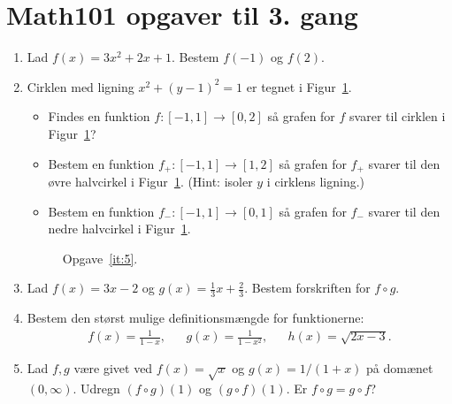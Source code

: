 \newpage
\section{Math101 opgaver til 3. gang}
\begin{enumerate}
	
	\item Lad $f(x)=3x^2+2x+1$. Bestem $f(-1)$ og $f(2)$.
	
	\item \label{it:5} Cirklen med ligning $x^{2} +(y-1)^{2}=1$ er tegnet i Figur~\ref{fig:5}.
	\begin{itemize}
		\item Findes en funktion $f\colon [-1,1]\to [0,2]$ så grafen for $f$ svarer til cirklen i Figur~\ref{fig:5}?
		\item Bestem en funktion $f_+\colon [-1,1]\to [1,2]$ så grafen for $f_+$ svarer til den øvre halvcirkel i Figur~\ref{fig:5}. (Hint: isoler $y$ i cirklens ligning.)
		\item Bestem en funktion $f_-\colon [-1,1]\to [0,1]$ så grafen for $f_-$ svarer til den nedre halvcirkel i Figur~\ref{fig:5}.
	\end{itemize}	
	\begin{figure}
		\centering
		\caption{Opgave~\ref{it:5}.}
		\label{fig:5}
	\end{figure}

	
	\item Lad $f(x)=3x-2$ og $g(x)=\frac{1}{3}x+\frac{2}{3}$. Bestem forskriften for $f\circ g$.

	\item Bestem den størst mulige definitionsmængde for funktionerne:
	\begin{align*}
	f(x)=\frac{1}{1-x},&& g(x)=\frac{1}{1-x^2},&& h(x)=\sqrt{2x-3}.
	\end{align*}
	
	
	\item  Lad $f,g$ være givet ved $f(x)=\sqrt{x}$ og $g(x)=1/(1+x)$ på domænet $(0,\infty)$. Udregn $(f\circ g)(1)$ og $(g\circ f)(1)$. Er $f\circ g=g\circ f$?
	

\end{enumerate}
